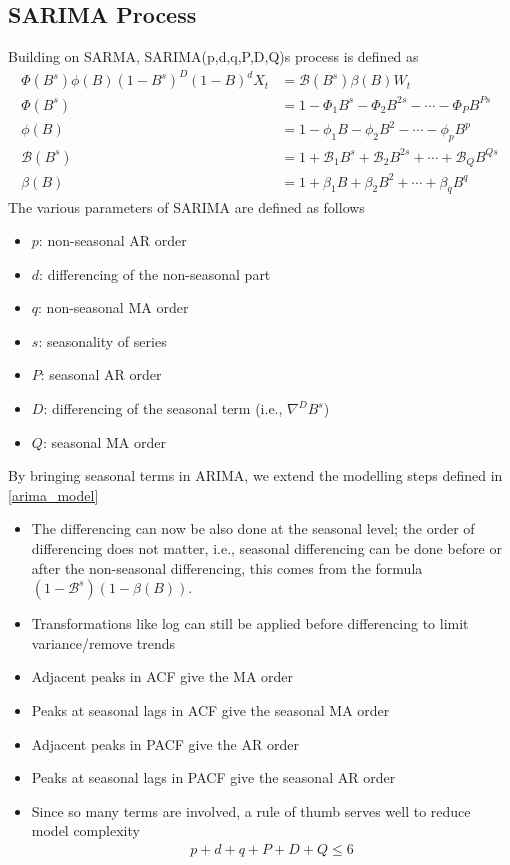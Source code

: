 \documentclass[../../time_series_notes.tex]{subfiles}
\begin{document}
\subsection{SARIMA Process}
Building on SARMA, SARIMA(p,d,q,P,D,Q)s process is defined as
\begin{align*}
    \Phi(B^{s})\phi(B)(1-B^{s})^{D}(1-B)^{d}X_{t} &= \mathcal{B}(B^{s})\beta(B)W_{t}\\
    \Phi(B^{s}) &= 1 - \Phi_{1}B^{s} -\Phi_{2}B^{2s} - \cdots - \Phi_{P}B^{Ps}\\
    \phi(B) &= 1 - \phi_{1}B - \phi_{2}B^{2} - \cdots - \phi_{p}B^{p}\\
    \mathcal{B}(B^{s}) &= 1 + \mathcal{B}_{1}B^{s} + \mathcal{B}_{2}B^{2s} + \cdots + \mathcal{B}_{Q}B^{Qs}\\
    \beta(B) &= 1 + \beta_{1}B + \beta_{2}B^{2} + \cdots + \beta_{q}B^{q}
\end{align*}
The various parameters of SARIMA are defined as follows
\begin{itemize}
    \item $p$: non-seasonal AR order
    \item $d$: differencing of the non-seasonal part
    \item $q$: non-seasonal MA order
    \item $s$: seasonality of series
    \item $P$: seasonal AR order
    \item $D$: differencing of the seasonal term (i.e., $\nabla^{D}B^{s}$)
    \item $Q$: seasonal MA order
\end{itemize}

By bringing seasonal terms in ARIMA, we extend the modelling steps defined in \ref{arima_model}
\begin{itemize}
    \item The differencing can now be also done at the seasonal level; the order of differencing does not matter, i.e., seasonal differencing can be done before or after the non-seasonal differencing, this comes from the formula $(1-\mathcal{B}^{s})(1-\beta(B))$.
    \item Transformations like log can still be applied before differencing to limit variance/remove trends
    \item Adjacent peaks in ACF give the MA order
    \item Peaks at seasonal lags in ACF give the seasonal MA order
    \item Adjacent peaks in PACF give the AR order
    \item Peaks at seasonal lags in PACF give the seasonal AR order
    \item Since so many terms are involved, a rule of thumb serves well to reduce model complexity
    \begin{align*}
        p+d+q+P+D+Q \leq 6
    \end{align*}
\end{itemize}
\end{document}
